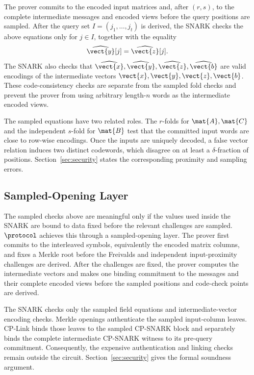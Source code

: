 The prover commits to the encoded input matrices and, after \((r,s)\), to the
complete intermediate messages and encoded views before the query positions
are sampled.  After the query set \(I=(j_1,\ldots,j_t)\) is derived, the SNARK
checks the above equations only for \(j\in I\), together with the equality
\[
  \widehat{\vect{y}}[j]=\widehat{\vect{z}}[j].
\]
The SNARK also checks that
\(\widehat{\vect{x}},\widehat{\vect{y}},\widehat{\vect{z}},
\widehat{\vect{b}}\) are valid
encodings of the intermediate vectors
\(\vect{x},\vect{y},\vect{z},\vect{b}\). These code-consistency checks are separate from
the sampled fold checks and prevent the prover from using arbitrary length-\(n\)
words as the intermediate encoded views.

The sampled equations have two related roles.  The \(r\)-folds for
\(\mat{A},\mat{C}\) and the independent \(s\)-fold for \(\mat{B}\) test that
the committed input words are close to row-wise encodings.  Once the inputs
are uniquely decoded, a false vector relation induces two distinct codewords,
which disagree on at least a \(\delta\)-fraction of positions.
Section~\ref{sec:security} states the corresponding proximity and sampling
errors.

\subsection{Sampled-Opening Layer}
\label{sec:overview-commit-link}

The sampled checks above are meaningful only if the values used inside the
SNARK are bound to data fixed before the relevant challenges are sampled.
\(\protocol\) achieves this through a sampled-opening layer.
The prover first commits to the interleaved symbols, equivalently the encoded
matrix columns, and fixes a Merkle root before the Freivalds and independent
input-proximity challenges are derived.  After the challenges are fixed, the
prover computes the intermediate vectors and makes one binding commitment to
the messages and their complete encoded views before the sampled positions and
code-check points are derived.

The SNARK checks only the sampled field equations and intermediate-vector
encoding checks.  Merkle openings authenticate the sampled input-column
leaves.  CP-Link binds those leaves to the sampled CP-SNARK block and separately
binds the complete intermediate CP-SNARK witness to its pre-query commitment.
Consequently, the expensive authentication and linking checks remain outside
the circuit.  Section~\ref{sec:security} gives the formal soundness argument.
